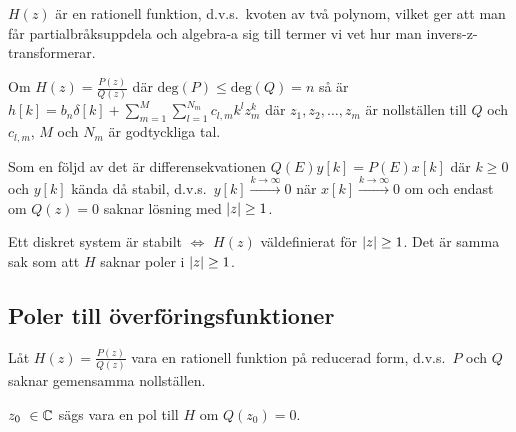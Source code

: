 \documentclass[a4paper]{article}
\begin{document}
\begin{ex}
    \(
        H(z)
    \) är en rationell funktion, d.v.s.\ kvoten av två polynom, vilket ger
    att man får partialbråksuppdela och algebra-a sig till termer vi vet 
    hur man invers-z-transformerar.

    \begin{påst}
        Om \(
            H(z) = \frac{P(z)}{Q(z)} 
        \) där \(
            \text{deg}(P) \leq \text{deg}(Q) = n 
        \) så är \(
            h[k] = b_n \delta[k] + \sum_{m=1}^M \sum_{l=1}^{N_m} c_{l,m} k^l z_m^k
        \) där \(
            z_1, z_2, \dots, z_m
        \) är nollställen till \(
            Q
        \) och \(
            c_{l,m}
        \), \(
            M
        \) och \(
            N_m 
        \) är godtyckliga tal.
    \end{påst}

    \begin{sats}
        Som en följd av det är differensekvationen \(
            Q(E)y[k] = P(E)x[k]
        \) där \(
            k \geq 0
        \) och \(
            y[k]
        \) kända då stabil, d.v.s.\ \(
            y[k] \xrightarrow{k\to \infty} 0
        \) när \(
            x[k] \xrightarrow{k \to \infty} 0
        \) om och endast om \(
            Q(z) = 0    
        \) saknar lösning med \(
            \abs{z} \geq 1
        \).
    \end{sats}
    
\end{ex}

\begin{sats}
    Ett diskret system är stabilt \(
        \iff 
    \) \(
        H(z)
    \) väldefinierat för \(
        \abs{z} \geq 1
    \). Det är samma sak som att \(
        H
    \) saknar poler i \(
        \abs{z} \geq 1
    \).
\end{sats}

\subsection{Poler till överföringsfunktioner}
\begin{defn}[Poler]
    Låt \(
        H(z) = \frac{P(z)}{Q(z)} 
    \) vara en rationell funktion på reducerad form, d.v.s.\ \(
        P
    \) och \(
        Q
    \) saknar gemensamma nollställen. 

    \(
        z_0 \in \compn
    \) sägs vara en pol till \(
        H
    \) om \(
        Q(z_0) = 0
    \).
\end{defn}
\end{document}
